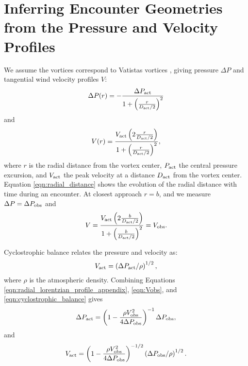 \documentclass{aastex63}
\begin{document}
\section{Inferring Encounter Geometries from the Pressure and Velocity Profiles}
\label{sec:Inferring Encounter Geometries from the Pressure and Velocity Profiles}
We assume the vortices correspond to Vatistas vortices \citep{1991ExFl...11...73V}, giving pressure $\Delta P$ and tangential wind velocity profiles $V$:
\begin{equation}
    \Delta P(r) = -\frac{\Delta P_{\rm act}}{1 + \left( \frac{r}{D_{\rm act}/2} \right)^2}\label{eqn:radial_lorentzian_profile_appendix}
\end{equation}
and
\begin{equation}
    V(r) = \frac{ V_{\rm act} \left( 2 \frac{r}{D_{\rm act}/2} \right)}{1 + \left( \frac{r}{D_{\rm act}/2} \right)^2},\label{eqn:radial_wind_profile}
\end{equation}
where $r$ is the radial distance from the vortex center, $P_{\rm act}$ the central pressure excursion, and $V_{\rm act}$ the peak velocity at a distance $D_{\rm act}$ from the vortex center. Equation \ref{eqn:radial_distance} shows the evolution of the radial distance with time during an encounter. At closest approach $r = b$, and we measure $\Delta P = \Delta P_{\rm obs}$ and 
\begin{equation}
    V = \frac{ V_{\rm act} \left( 2\frac{b}{D_{\rm act}/2} \right)}{1 + \left( \frac{b}{D_{\rm act}/2} \right)^2} = V_{\rm obs}.\label{eqn:Vobs}
\end{equation} 

Cyclostrophic balance relates the pressure and velocity \citep{2020Icar..33813523J} as:
\begin{equation}
    V_{\rm act} = \left( \Delta P_{\rm act}/\rho \right)^{1/2},\label{eqn:cyclostrophic_balance}
\end{equation}
where $\rho$ is the atmospheric density. Combining Equations \ref{eqn:radial_lorentzian_profile_appendix}, \ref{eqn:Vobs}, and \ref{eqn:cyclostrophic_balance} gives
\begin{equation}
    \Delta P_{\rm act} = \left( 1 - \frac{\rho V_{\rm obs}^2}{4 \Delta P_{\rm obs}} \right)^{-1} \Delta P_{\rm obs},\label{eqn:solution_for_Pact}
\end{equation}
and
\begin{equation}
    V_{\rm act} = \left( 1 - \frac{\rho V_{\rm obs}^2}{4 \Delta P_{\rm obs}} \right)^{-1/2} \left( \Delta P_{\rm obs}/\rho \right)^{1/2}.\label{eqn:solution_for_Vact}
\end{equation}
\end{document}
